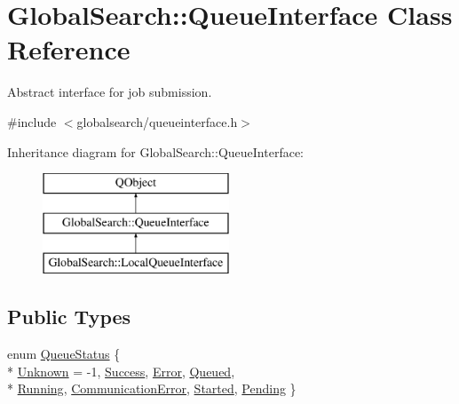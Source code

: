 \hypertarget{classGlobalSearch_1_1QueueInterface}{}\section{Global\+Search\+:\+:Queue\+Interface Class Reference}
\label{classGlobalSearch_1_1QueueInterface}


Abstract interface for job submission.  




{\ttfamily \#include $<$globalsearch/queueinterface.\+h$>$}

Inheritance diagram for Global\+Search\+:\+:Queue\+Interface\+:\begin{figure}[H]
\begin{center}
\leavevmode
\includegraphics[height=3.000000cm]{classGlobalSearch_1_1QueueInterface}
\end{center}
\end{figure}
\subsection*{Public Types}
\begin{DoxyCompactItemize}
\item 
enum \hyperlink{classGlobalSearch_1_1QueueInterface_a08dcf06d1b99f6333472470490ca9a6d}{Queue\+Status} \{ \\*
\hyperlink{classGlobalSearch_1_1QueueInterface_a08dcf06d1b99f6333472470490ca9a6da4960b69e5e05b425331bba80e5b59e20}{Unknown} = -\/1, 
\hyperlink{classGlobalSearch_1_1QueueInterface_a08dcf06d1b99f6333472470490ca9a6da4be480247388114f3860f7e746df65e9}{Success}, 
\hyperlink{classGlobalSearch_1_1QueueInterface_a08dcf06d1b99f6333472470490ca9a6dabaf3f4a536a56b3a2ac6643de3e4689f}{Error}, 
\hyperlink{classGlobalSearch_1_1QueueInterface_a08dcf06d1b99f6333472470490ca9a6da4c4e184400d3f455f263dc029217fc9a}{Queued}, 
\\*
\hyperlink{classGlobalSearch_1_1QueueInterface_a08dcf06d1b99f6333472470490ca9a6da46d29e0584d720fdb20334913c0a5822}{Running}, 
\hyperlink{classGlobalSearch_1_1QueueInterface_a08dcf06d1b99f6333472470490ca9a6da96ca4ddb429576d197eefe0e6b3a3a98}{Communication\+Error}, 
\hyperlink{classGlobalSearch_1_1QueueInterface_a08dcf06d1b99f6333472470490ca9a6dad54b02ac97bb4a875b105a31489f7aa7}{Started}, 
\hyperlink{classGlobalSearch_1_1QueueInterface_a08dcf06d1b99f6333472470490ca9a6da08ea952b51a67578345517c853e66801}{Pending}
 \}
\end{DoxyCompactItemize}
